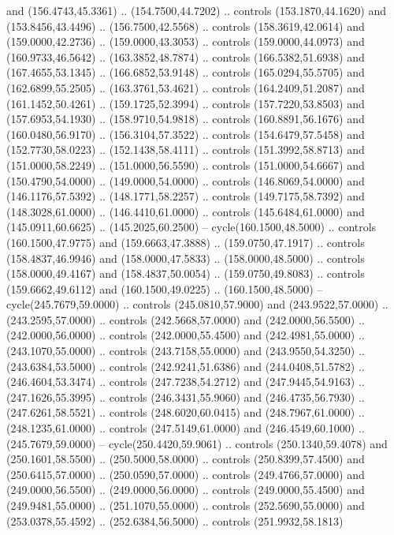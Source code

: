   and (156.4743,45.3361) .. (154.7500,44.7202) .. controls (153.1870,44.1620)
  and (153.8456,43.4496) .. (156.7500,42.5568) .. controls (158.3619,42.0614)
  and (159.0000,42.2736) .. (159.0000,43.3053) .. controls (159.0000,44.0973)
  and (160.9733,46.5642) .. (163.3852,48.7874) .. controls (166.5382,51.6938)
  and (167.4655,53.1345) .. (166.6852,53.9148) .. controls (165.0294,55.5705)
  and (162.6899,55.2505) .. (163.3761,53.4621) .. controls (164.2409,51.2087)
  and (161.1452,50.4261) .. (159.1725,52.3994) .. controls (157.7220,53.8503)
  and (157.6953,54.1930) .. (158.9710,54.9818) .. controls (160.8891,56.1676)
  and (160.0480,56.9170) .. (156.3104,57.3522) .. controls (154.6479,57.5458)
  and (152.7730,58.0223) .. (152.1438,58.4111) .. controls (151.3992,58.8713)
  and (151.0000,58.2249) .. (151.0000,56.5590) .. controls (151.0000,54.6667)
  and (150.4790,54.0000) .. (149.0000,54.0000) .. controls (146.8069,54.0000)
  and (146.1176,57.5392) .. (148.1771,58.2257) .. controls (149.7175,58.7392)
  and (148.3028,61.0000) .. (146.4410,61.0000) .. controls (145.6484,61.0000)
  and (145.0911,60.6625) .. (145.2025,60.2500) -- cycle(160.1500,48.5000) ..
  controls (160.1500,47.9775) and (159.6663,47.3888) .. (159.0750,47.1917) ..
  controls (158.4837,46.9946) and (158.0000,47.5833) .. (158.0000,48.5000) ..
  controls (158.0000,49.4167) and (158.4837,50.0054) .. (159.0750,49.8083) ..
  controls (159.6662,49.6112) and (160.1500,49.0225) .. (160.1500,48.5000) --
  cycle(245.7679,59.0000) .. controls (245.0810,57.9000) and (243.9522,57.0000)
  .. (243.2595,57.0000) .. controls (242.5668,57.0000) and (242.0000,56.5500) ..
  (242.0000,56.0000) .. controls (242.0000,55.4500) and (242.4981,55.0000) ..
  (243.1070,55.0000) .. controls (243.7158,55.0000) and (243.9550,54.3250) ..
  (243.6384,53.5000) .. controls (242.9241,51.6386) and (244.0408,51.5782) ..
  (246.4604,53.3474) .. controls (247.7238,54.2712) and (247.9445,54.9163) ..
  (247.1626,55.3995) .. controls (246.3431,55.9060) and (246.4735,56.7930) ..
  (247.6261,58.5521) .. controls (248.6020,60.0415) and (248.7967,61.0000) ..
  (248.1235,61.0000) .. controls (247.5149,61.0000) and (246.4549,60.1000) ..
  (245.7679,59.0000) -- cycle(250.4420,59.9061) .. controls (250.1340,59.4078)
  and (250.1601,58.5500) .. (250.5000,58.0000) .. controls (250.8399,57.4500)
  and (250.6415,57.0000) .. (250.0590,57.0000) .. controls (249.4766,57.0000)
  and (249.0000,56.5500) .. (249.0000,56.0000) .. controls (249.0000,55.4500)
  and (249.9481,55.0000) .. (251.1070,55.0000) .. controls (252.5690,55.0000)
  and (253.0378,55.4592) .. (252.6384,56.5000) .. controls (251.9932,58.1813)
